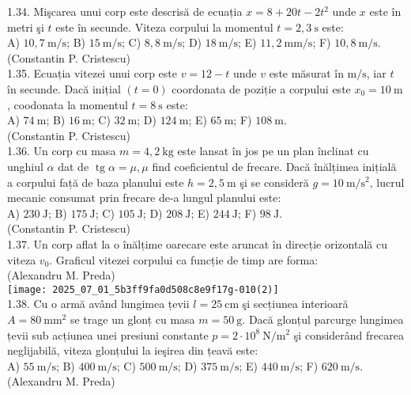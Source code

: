 1.34. Mişcarea unui corp este descrisă de ecuația $x=8+20 t-2 t^{2}$ unde $x$ este în metri şi $t$ este în secunde. Viteza corpului la momentul $t=2,3 \mathrm{~s}$ este:\\ A) $10,7 \mathrm{~m} / \mathrm{s}$; B) $15 \mathrm{~m} / \mathrm{s}$; C) $8,8 \mathrm{~m} / \mathrm{s}$; D) $18 \mathrm{~m} / \mathrm{s}$; E) $11,2 \mathrm{~mm} / \mathrm{s}$; F) $10,8 \mathrm{~m} / \mathrm{s}$.\\ (Constantin P. Cristescu)\\

1.35. Ecuația vitezei unui corp este $v=12-t$ unde $v$ este măsurat în $\mathrm{m} / \mathrm{s}$, iar $t$ în secunde. Dacă inițial $(t=0)$ coordonata de poziție a corpului este $x_{0}=10 \mathrm{~m}$, coodonata la momentul $t=8 \mathrm{~s}$ este:\\ A) $74 \mathrm{~m}$; B) $16 \mathrm{~m}$; C) $32 \mathrm{~m}$; D) $124 \mathrm{~m}$; E) $65 \mathrm{~m}$; F) $108 \mathrm{~m}$.\\ (Constantin P. Cristescu)\\

1.36. Un corp cu masa $m=4,2 \mathrm{~kg}$ este lansat în jos pe un plan înclinat cu unghiul $\alpha$ dat de $\operatorname{tg} \alpha=\mu, \mu$ find coeficientul de frecare. Dacă înălțimea inițială a corpului față de baza planului este $h=2,5 \mathrm{~m}$ şi se consideră $g=10 \mathrm{~m} / \mathrm{s}^{2}$, lucrul mecanic consumat prin frecare de-a lungul planului este:\\ A) $230 \mathrm{~J}$; B) $175 \mathrm{~J}$; C) $105 \mathrm{~J}$; D) $208 \mathrm{~J}$; E) $244 \mathrm{~J}$; F) $98 \mathrm{~J}$.\\ (Constantin P. Cristescu)\\

1.37. Un corp aflat la o înălțime oarecare este aruncat în direcție orizontală cu viteza $v_{0}$. Graficul vitezei corpului ca funcție de timp are forma:\\ (Alexandru M. Preda)\\ \texttt{[image: 2025\_07\_01\_5b3ff9fa0d508c8e9f17g-010(2)]}\\

1.38. Cu o armă având lungimea țevii $l=25 \mathrm{~cm}$ şi secțiunea interioară $A=80 \mathrm{~mm}^{2}$ se trage un glonț cu masa $m=50 \mathrm{~g}$. Dacă glonțul parcurge lungimea țevii sub acțiunea unei presiuni constante $p=2 \cdot 10^{8} \mathrm{~N} / \mathrm{m}^{2}$ şi considerând frecarea neglijabilă, viteza glonțului la ieşirea din țeavă este:\\ A) $55 \mathrm{~m} / \mathrm{s}$; B) $400 \mathrm{~m} / \mathrm{s}$; C) $500 \mathrm{~m} / \mathrm{s}$; D) $375 \mathrm{~m} / \mathrm{s}$; E) $440 \mathrm{~m} / \mathrm{s}$; F) $620 \mathrm{~m} / \mathrm{s}$.\\ (Alexandru M. Preda)\\

